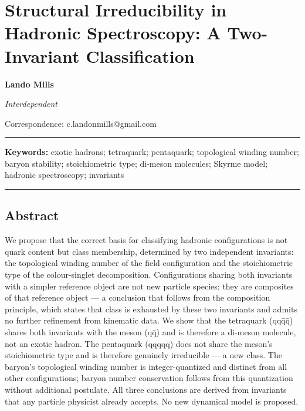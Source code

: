 \hypertarget{structural-irreducibility-in-hadronic-spectroscopy-a-two-invariant-classification}{%
\section{Structural Irreducibility in Hadronic Spectroscopy: A
Two-Invariant
Classification}\label{structural-irreducibility-in-hadronic-spectroscopy-a-two-invariant-classification}}

\textbf{Lando Mills}

\emph{Interdependent}

Correspondence: c.landonmills@gmail.com

\begin{center}\rule{0.5\linewidth}{0.5pt}\end{center}

\textbf{Keywords:} exotic hadrons; tetraquark; pentaquark; topological
winding number; baryon stability; stoichiometric type; di-meson
molecules; Skyrme model; hadronic spectroscopy; invariants

\begin{center}\rule{0.5\linewidth}{0.5pt}\end{center}

\hypertarget{abstract}{%
\subsection*{Abstract}\label{abstract}}

We propose that the correct basis for classifying hadronic
configurations is not quark content but class membership,
determined by two independent invariants: the topological winding number
of the field configuration and the stoichiometric type of the
colour-singlet decomposition. Configurations sharing both invariants
with a simpler reference object are not new particle species; they are
composites of that reference object --- a conclusion that follows from
the composition principle, which states that class is
exhausted by these two invariants and admits no further refinement from
kinematic data. We show that the tetraquark (qqq̄q̄) shares both
invariants with the meson (qq̄) and is therefore a di-meson molecule, not
an exotic hadron. The pentaquark (qqqqq̄) does not share the meson's
stoichiometric type and is therefore genuinely irreducible --- a new
class. The baryon's topological winding number is
integer-quantized and distinct from all other configurations; baryon
number conservation follows from this quantization without additional
postulate. All three conclusions are derived from invariants that any
particle physicist already accepts. No new dynamical model is proposed.


